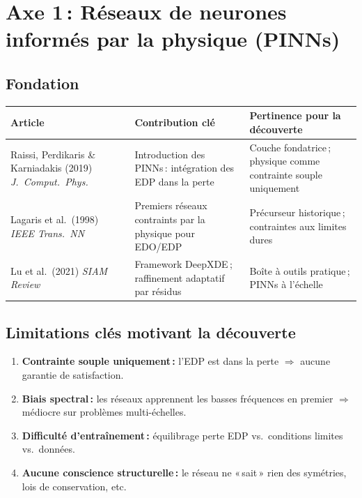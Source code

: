 \documentclass[11pt,a4paper]{article}
\begin{document}
\section{Axe 1\,: Réseaux de neurones informés par la physique (PINNs)}

\subsection{Fondation}

\begin{center}
\renewcommand{\arraystretch}{1.3}
\begin{tabular}{@{}p{3.5cm} p{4cm} p{5.5cm}@{}}
\toprule
\textbf{Article} & \textbf{Contribution clé} & \textbf{Pertinence pour la découverte} \\
\midrule
Raissi, Perdikaris \& Karniadakis (2019) \textit{J.\ Comput.\ Phys.} & Introduction des PINNs\,: intégration des EDP dans la perte & Couche fondatrice\,; physique comme contrainte souple uniquement \\
\addlinespace
Lagaris et al.\ (1998) \textit{IEEE Trans.\ NN} & Premiers réseaux contraints par la physique pour EDO/EDP & Précurseur historique\,; contraintes aux limites dures \\
\addlinespace
Lu et al.\ (2021) \textit{SIAM Review} & Framework DeepXDE\,; raffinement adaptatif par résidus & Boîte à outils pratique\,; PINNs à l'échelle \\
\bottomrule
\end{tabular}
\end{center}

\subsection{Limitations clés motivant la découverte}

\begin{enumerate}[leftmargin=1.8em,itemsep=2pt]
\item \textbf{Contrainte souple uniquement\,:} l'EDP est dans la perte $\Rightarrow$ aucune garantie de satisfaction.
\item \textbf{Biais spectral\,:} les réseaux apprennent les basses fréquences en premier $\Rightarrow$ médiocre sur problèmes multi-échelles.
\item \textbf{Difficulté d'entraînement\,:} équilibrage perte EDP vs.\ conditions limites vs.\ données.
\item \textbf{Aucune conscience structurelle\,:} le réseau ne «\,sait\,» rien des symétries, lois de conservation, etc.
\end{enumerate}
\end{document}
